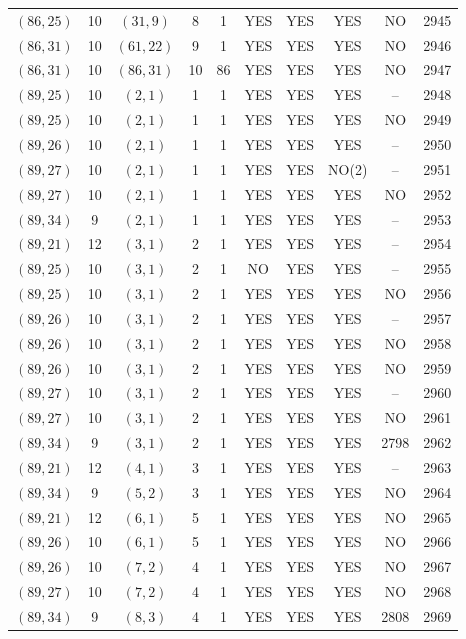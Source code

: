 \begin{longtable}{|c|c|c|c|c|c|c|c|c|c|}
$(86, 25)$ & 10 & $(31, 9)$ & 8 & 1 & YES & YES & YES & NO & 2945\\
$(86, 31)$ & 10 & $(61, 22)$ & 9 & 1 & YES & YES & YES & NO & 2946\\
$(86, 31)$ & 10 & $(86, 31)$ & 10 & 86 & YES & YES & YES & NO & 2947\\
$(89, 25)$ & 10 & $(2, 1)$ & 1 & 1 & YES & YES & YES & -- & 2948\\
$(89, 25)$ & 10 & $(2, 1)$ & 1 & 1 & YES & YES & YES & NO & 2949\\
$(89, 26)$ & 10 & $(2, 1)$ & 1 & 1 & YES & YES & YES & -- & 2950\\
$(89, 27)$ & 10 & $(2, 1)$ & 1 & 1 & YES & YES & NO(2) & -- & 2951\\
$(89, 27)$ & 10 & $(2, 1)$ & 1 & 1 & YES & YES & YES & NO & 2952\\
$(89, 34)$ & 9 & $(2, 1)$ & 1 & 1 & YES & YES & YES & -- & 2953\\
$(89, 21)$ & 12 & $(3, 1)$ & 2 & 1 & YES & YES & YES & -- & 2954\\
$(89, 25)$ & 10 & $(3, 1)$ & 2 & 1 & NO & YES & YES & -- & 2955\\
$(89, 25)$ & 10 & $(3, 1)$ & 2 & 1 & YES & YES & YES & NO & 2956\\
$(89, 26)$ & 10 & $(3, 1)$ & 2 & 1 & YES & YES & YES & -- & 2957\\
$(89, 26)$ & 10 & $(3, 1)$ & 2 & 1 & YES & YES & YES & NO & 2958\\
$(89, 26)$ & 10 & $(3, 1)$ & 2 & 1 & YES & YES & YES & NO & 2959\\
$(89, 27)$ & 10 & $(3, 1)$ & 2 & 1 & YES & YES & YES & -- & 2960\\
$(89, 27)$ & 10 & $(3, 1)$ & 2 & 1 & YES & YES & YES & NO & 2961\\
$(89, 34)$ & 9 & $(3, 1)$ & 2 & 1 & YES & YES & YES & 2798 & 2962\\
$(89, 21)$ & 12 & $(4, 1)$ & 3 & 1 & YES & YES & YES & -- & 2963\\
$(89, 34)$ & 9 & $(5, 2)$ & 3 & 1 & YES & YES & YES & NO & 2964\\
$(89, 21)$ & 12 & $(6, 1)$ & 5 & 1 & YES & YES & YES & NO & 2965\\
$(89, 26)$ & 10 & $(6, 1)$ & 5 & 1 & YES & YES & YES & NO & 2966\\
$(89, 26)$ & 10 & $(7, 2)$ & 4 & 1 & YES & YES & YES & NO & 2967\\
$(89, 27)$ & 10 & $(7, 2)$ & 4 & 1 & YES & YES & YES & NO & 2968\\
$(89, 34)$ & 9 & $(8, 3)$ & 4 & 1 & YES & YES & YES & 2808 & 2969\\

\end{longtable}
